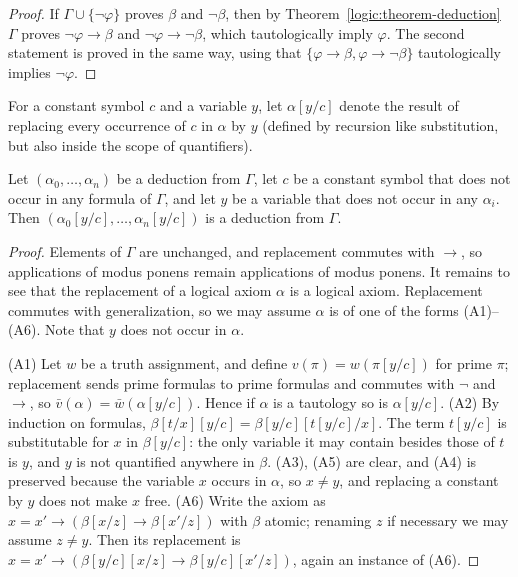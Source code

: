 \begin{proof}
If $\Gamma \cup \{\neg\varphi\}$ proves $\beta$ and $\neg\beta$, then by
Theorem~\ref{logic:theorem-deduction} $\Gamma$ proves $\neg\varphi \to \beta$ and
$\neg\varphi \to \neg\beta$, which tautologically imply $\varphi$. The second
statement is proved in the same way, using that
$\{\varphi \to \beta, \varphi \to \neg\beta\}$ tautologically implies
$\neg\varphi$.
\end{proof}

For a constant symbol $c$ and a variable $y$, let $\alpha[y/c]$ denote the
result of replacing every occurrence of $c$ in $\alpha$ by $y$ (defined by
recursion like substitution, but also inside the scope of quantifiers).

\begin{lemma}\label{logic:lemma-replace-constants}
Let $(\alpha_0, \ldots, \alpha_n)$ be a deduction from $\Gamma$, let $c$ be a
constant symbol that does not occur in any formula of $\Gamma$, and let $y$ be
a variable that does not occur in any $\alpha_i$. Then
$(\alpha_0[y/c], \ldots, \alpha_n[y/c])$ is a deduction from $\Gamma$.
\end{lemma}

\begin{proof}
Elements of $\Gamma$ are unchanged, and replacement commutes with $\to$, so
applications of modus ponens remain applications of modus ponens. It remains
to see that the replacement of a logical axiom $\alpha$ is a logical axiom.
Replacement commutes with generalization, so we may assume $\alpha$ is of one
of the forms (A1)--(A6). Note that $y$ does not occur in $\alpha$.

(A1) Let $w$ be a truth assignment, and define $v(\pi) = w(\pi[y/c])$ for prime
$\pi$; replacement sends prime formulas to prime formulas and commutes with
$\neg$ and $\to$, so $\bar v(\alpha) = \bar w(\alpha[y/c])$. Hence if $\alpha$ is a
tautology so is $\alpha[y/c]$.
(A2) By induction on formulas, $\beta[t/x][y/c] = \beta[y/c][t[y/c]/x]$. The
term $t[y/c]$ is substitutable for $x$ in $\beta[y/c]$: the only variable it
may contain besides those of $t$ is $y$, and $y$ is not quantified anywhere
in $\beta$.
(A3), (A5) are clear, and (A4) is preserved because the variable $x$ occurs in
$\alpha$, so $x \neq y$, and replacing a constant by $y$ does not make $x$
free.
(A6) Write the axiom as $x = x' \to (\beta[x/z] \to \beta[x'/z])$ with $\beta$
atomic; renaming $z$ if necessary we may assume $z \neq y$. Then its
replacement is $x = x' \to (\beta[y/c][x/z] \to \beta[y/c][x'/z])$, again an
instance of (A6).
\end{proof}


